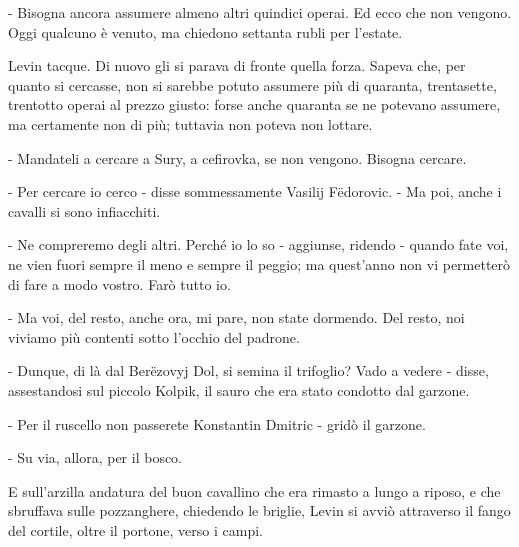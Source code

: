 - Bisogna ancora assumere almeno altri quindici operai. Ed ecco che non vengono. Oggi qualcuno è venuto, ma chiedono settanta rubli per l'estate. 

Levin tacque. Di nuovo gli si parava di fronte quella forza. Sapeva che, per quanto si cercasse, non si sarebbe potuto assumere più di quaranta, trentasette, trentotto operai al prezzo giusto: forse anche quaranta se ne potevano assumere, ma certamente non di più; tuttavia non poteva non lottare. 

- Mandateli a cercare a Sury, a cefirovka, se non vengono. Bisogna cercare. 

- Per cercare io cerco - disse sommessamente Vasilij Fëdorovic. - Ma poi, anche i cavalli si sono infiacchiti. 

- Ne compreremo degli altri. Perché io lo so - aggiunse, ridendo - quando fate voi, ne vien fuori sempre il meno e sempre il peggio; ma quest'anno non vi permetterò di fare a modo vostro. Farò tutto io. 

- Ma voi, del resto, anche ora, mi pare, non state dormendo. Del resto, noi viviamo più contenti sotto l'occhio del padrone. 

- Dunque, di là dal Berëzovyj Dol, si semina il trifoglio? Vado a vedere - disse, assestandosi sul piccolo Kolpik, il sauro che era stato condotto dal garzone. 

- Per il ruscello non passerete Konstantin Dmitric - gridò il garzone. 

- Su via, allora, per il bosco. 

E sull'arzilla andatura del buon cavallino che era rimasto a lungo a riposo, e che sbruffava sulle pozzanghere, chiedendo le briglie, Levin si avviò attraverso il fango del cortile, oltre il portone, verso i campi. 

